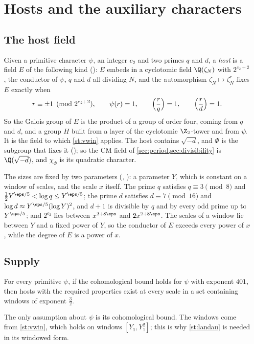 \section{Hosts and the auxiliary characters}\label{sec:hosts}

\subsection{The host field}
Given a primitive character $\psi$, an integer $e_2$ and two primes $q$ and $d$, a \emph{host} is
a field $E$ of the following kind \lvS{} (): $E$ embeds in a cyclotomic field
$\Q(\zeta_N)$ with $2^{e_2+2}$, the conductor of $\psi$, $q$ and $d$ all dividing $N$, and the
automorphism $\zeta_N\mapsto\zeta_N^{r}$ fixes $E$ exactly when
\[
r\equiv\pm1\pmod{2^{e_2+2}},\qquad \psi(r)=1,\qquad \Bigl(\frac rq\Bigr)=1,\qquad
\Bigl(\frac rd\Bigr)=1 .
\]
So the Galois group of $E$ is the product of a group of order four, coming from $q$ and $d$,
and a group $H$ built from a layer of the cyclotomic $\Z_2$-tower and from $\psi$. It is the
field to which \cref{st:vwin} applies. The host contains $\sqrt{-d}$, and $\Phi$ is the subgroup
that fixes it (); so the CM field of \cref{sec:period,sec:divisibility} is
$\Q(\sqrt{-d})$, and $\chi_\Phi$ is its quadratic character.

The sizes are fixed by two parameters \lvS{} (, ): a parameter $Y$,
which is constant on a window of scales, and the scale $x$ itself. The prime
$q$ satisfies $q\equiv3\pmod8$ and $\tfrac12Y^{\eps/5}<\log q\le Y^{\eps/5}$; the prime $d$
satisfies $d\equiv7\pmod{16}$ and $\log d\approx Y^{\eps/5}(\log Y)^2$, and $d+1$ is divisible
by $q$ and by every odd prime up to $Y^{\eps/5}$; and $2^{e_2}$ lies between $x^{2+8\eps}$ and
$2x^{2+8\eps}$. The scales of a window lie between $Y$ and a fixed power of $Y$, so the
conductor of $E$ exceeds every power of $x$, while the degree of $E$ is a power of $x$.

\subsection{Supply}
\begin{statement}\label{st:supply}
For every primitive $\psi$, if the cohomological bound holds for $\psi$ with exponent $401$,
then hosts with the required properties exist at every scale in a set containing windows of
exponent $\tfrac32$.
\end{statement}
The only assumption about $\psi$ is its cohomological bound. The windows come from
\cref{st:vwin}, which holds on windows $[Y_1,Y_1^2]$; this is why \cref{st:landau} is needed in its
windowed form.

